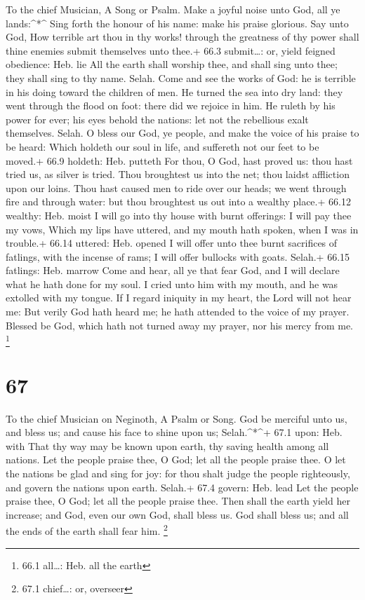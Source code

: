 To the chief Musician, A Song or Psalm.  Make a joyful noise
unto God, all ye lands:\^{}*\^{}  Sing forth the honour of
his name: make his praise glorious.  Say unto God, How
terrible art thou in thy works! through the greatness of thy power shall
thine enemies submit themselves unto thee.+ 66.3 submit\ldots: or, yield
feigned obedience: Heb. lie  All the earth shall worship
thee, and shall sing unto thee; they shall sing to thy name. Selah.
 Come and see the works of God: he is terrible in his doing
toward the children of men.  He turned the sea into dry
land: they went through the flood on foot: there did we rejoice in him.
 He ruleth by his power for ever; his eyes behold the
nations: let not the rebellious exalt themselves. Selah.  O
bless our God, ye people, and make the voice of his praise to be heard:
 Which holdeth our soul in life, and suffereth not our feet
to be moved.+ 66.9 holdeth: Heb. putteth  For thou, O God,
hast proved us: thou hast tried us, as silver is tried. 
Thou broughtest us into the net; thou laidst affliction upon our loins.
 Thou hast caused men to ride over our heads; we went
through fire and through water: but thou broughtest us out into a
wealthy place.+ 66.12 wealthy: Heb. moist  I will go into
thy house with burnt offerings: I will pay thee my vows, 
Which my lips have uttered, and my mouth hath spoken, when I was in
trouble.+ 66.14 uttered: Heb. opened  I will offer unto
thee burnt sacrifices of fatlings, with the incense of rams; I will
offer bullocks with goats. Selah.+ 66.15 fatlings: Heb. marrow
 Come and hear, all ye that fear God, and I will declare
what he hath done for my soul.  I cried unto him with my
mouth, and he was extolled with my tongue.  If I regard
iniquity in my heart, the Lord will not hear me:  But
verily God hath heard me; he hath attended to the voice of my prayer.
 Blessed be God, which hath not turned away my prayer, nor
his mercy from me. \footnote{66.1 all\ldots: Heb. all the earth}

\hypertarget{section-66}{%
\section{67}\label{section-66}}

To the chief Musician on Neginoth, A Psalm or Song.  God be
merciful unto us, and bless us; and cause his face to shine upon us;
Selah.\^{}*\^{}+ 67.1 upon: Heb. with  That thy way may be
known upon earth, thy saving health among all nations.  Let
the people praise thee, O God; let all the people praise thee.
 O let the nations be glad and sing for joy: for thou shalt
judge the people righteously, and govern the nations upon earth. Selah.+
67.4 govern: Heb. lead  Let the people praise thee, O God;
let all the people praise thee.  Then shall the earth yield
her increase; and God, even our own God, shall bless us. 
God shall bless us; and all the ends of the earth shall fear him.
\footnote{67.1 chief\ldots: or, overseer}

